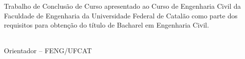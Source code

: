 \begin{folhadeaprovacao}
    \thispagestyle{empty}
    \OnehalfSpacing

    \begin{center}
        {\fontsize{12pt}{12pt}\selectfont\MakeUppercase{\imprimirautor}\par}
        
        \vspace{15ex} 

        {\fontsize{12pt}{12pt}\selectfont\bfseries\MakeUppercase{\imprimirtitulo}\par}
    \end{center}

    \vspace{10ex}

    
    \begin{flushright}
        \begin{minipage}{0.5\textwidth}
            {\fontsize{11pt}{11pt}\selectfont
            Trabalho de Conclusão de Curso apresentado ao Curso de Engenharia Civil da Faculdade de Engenharia da Universidade Federal de Catalão como parte dos requisitos para obtenção do título de Bacharel em Engenharia Civil.\par}
        \end{minipage}
    \end{flushright}

    \vspace{10ex}


    \vspace{8ex}

    \begin{flushleft}
        {\fontsize{12pt}{12pt}\selectfont
        
        \imprimirorientador \\
        Orientador -- FENG/UFCAT \\
        \vspace{6ex}
        
        
}
\end{flushleft}
\end{folhadeaprovacao}
